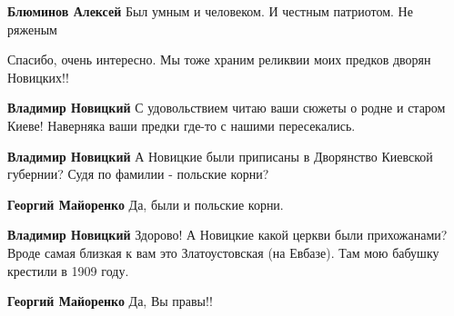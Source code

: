 \begin{itemize}
\begin{itemize}
\textbf{Блюминов Алексей} Был умным и человеком. И честным патриотом. Не ряженым
\end{itemize} %

Спасибо, очень интересно. Мы тоже храним реликвии моих предков дворян Новицких!!

\begin{itemize} %
\textbf{Владимир Новицкий} С удовольствием читаю ваши сюжеты о родне и старом Киеве! Наверняка ваши предки где-то с нашими пересекались.

\textbf{Владимир Новицкий} А Новицкие были приписаны в Дворянство Киевской губернии? Судя по фамилии - польские корни?

\begin{itemize} %
\textbf{Георгий Майоренко} Да, были и польские корни.

\textbf{Владимир Новицкий} Здорово! А Новицкие какой церкви были прихожанами? Вроде самая близкая к вам это Златоустовская (на Евбазе). Там мою бабушку крестили в 1909 году.
\end{itemize} %

\textbf{Георгий Майоренко} Да, Вы правы!!

\end{itemize} %

\end{itemize} %
